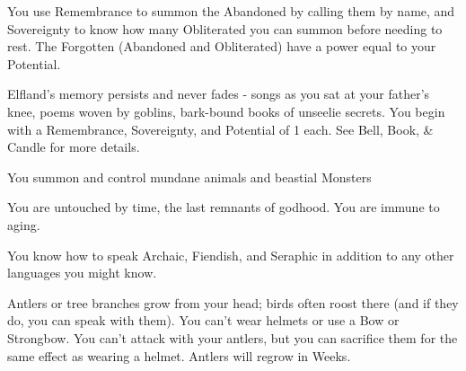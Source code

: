 {  

   You use Remembrance to summon the Abandoned by calling them by name, and Sovereignty to know how many Obliterated you can summon before needing to rest.  The Forgotten (Abandoned and Obliterated) have a power equal to your Potential.




    
  Elfland's memory persists and never fades - songs as you sat at your father's knee, poems woven by goblins, bark-bound books of unseelie secrets. You begin with a Remembrance, Sovereignty, and Potential of 1 each.  See Bell, Book, \& Candle for more details.


   You summon and control mundane animals and beastial Monsters\footnotemark[\value{footnote}]

  
  You are untouched by time, the last remnants of godhood.  You are immune to aging.  


  You know how to speak Archaic, Fiendish, and Seraphic in addition to any other languages you might know.

  \cbreak



  Antlers or tree branches grow from your head; birds often roost there (and if they do, you can speak with them).  You can't wear helmets or use a Bow or Strongbow. You can't attack with your antlers, but you can sacrifice them for the same effect as wearing a helmet. Antlers will regrow in Weeks.


}
